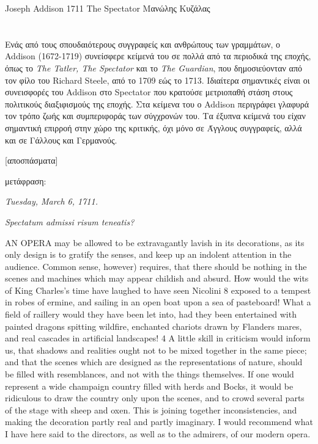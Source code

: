 \translationsetup
    {Joseph Addison}
    {1711}
    {The Spectator}
    {Μανώλης Κυζάλας}

\pagestyle{texts}
\chapter
    [\originalauthor\ -- \emph{\translatedtitle} (αποσπάσματα)  -- \yearpublished]
    {\originalauthor}

\begin{preface}
    Ενάς από τους σπουδαιότερους συγγραφείς και ανθρώπους των γραμμάτων, ο Addison (1672-1719) συνείσφερε κείμενά του σε πολλά από τα περιοδικά της εποχής, όπως το \emph{The Tatler, The Spectator} και το \emph{The Guardian}, που δημοσιεύονταν από τον φίλο του Richard Steele, από το 1709 εώς το 1713. Ιδιαίτερα σημαντικές είναι οι συνεισφορές του Addison στο Spectator που κρατούσε μετριοπαθή στάση στους πολιτικούς διαξιφισμούς της εποχής. Στα κείμενα του ο Addison περιγράφει γλαφυρά τον τρόπο ζωής και συμπεριφοράς των σύγχρονών του. Τα έξυπνα κείμενά του είχαν σημαντική επιρροή στην χώρο της κριτικής, όχι μόνο σε Άγγλους συγγραφείς, αλλά και σε Γάλλους και Γερμανούς.
\end{preface}

\begin{center}
    \textbf{\translatedtitle}

    [αποσπάσματα]

    μετάφραση: \maintranslator
\end{center}

\begin{center}
    \emph{Tuesday, March 6, 1711.}

    \emph{Spectatum admissi risum teneatis?}
\end{center}

AN OPERA may be allowed to be extravagantly lavish in its decorations, as its only design is to gratify the senses, and keep up an indolent attention in the audience. Common sense, however) requires, that there should be nothing in the scenes and machines which may appear childish and absurd. How would the wits of King Charles's time have laughed to have seen Nicolini 8 exposed to a tempest in robes of ermine, and sailing in an open boat upon a sea of pasteboard! What a field of raillery would they have been let into, had they been entertained with painted dragons spitting wildfire, enchanted chariots drawn by Flanders mares, and real cascades in artificial landscapes! 4 A little skill in criticism would inform us, that shadows and realities ought not to be mixed together in the same piece; and that the scenes which are designed as the representations of nature, should be filled with resemblances, and not with the things themselves. If one would represent a wide champaign country filled with herds and Bocks, it would be ridiculous to draw the country only upon the scenes, and to crowd several parts of the stage with sheep and oxen. This is joining together inconsistencies, and making the decoration partly real and partly imaginary. I would recommend what I have here said to the directors, as well as to the admirers, of our modern opera.

